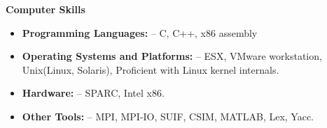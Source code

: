 \documentclass{article}
\begin{document}
%

  \vspace*{-0.1truein}
  \large \textbf{Computer Skills}
  \normalsize
  \vspace*{-0.2truein}
  \begin{center}
  \begin{itemize}
	\item {\textbf{Programming Languages:} -- C, C++, x86 assembly}
	\item {\textbf{Operating Systems and Platforms:} -- ESX, VMware workstation, Unix(Linux, Solaris), Proficient with Linux
	kernel internals.}
	\item {\textbf{Hardware:} -- SPARC, Intel x86.} 
	\item {\textbf{Other Tools:} -- MPI, MPI-IO, SUIF, CSIM, MATLAB, Lex, Yacc.}
  \end{itemize}
  \end{center}
\end{document}
